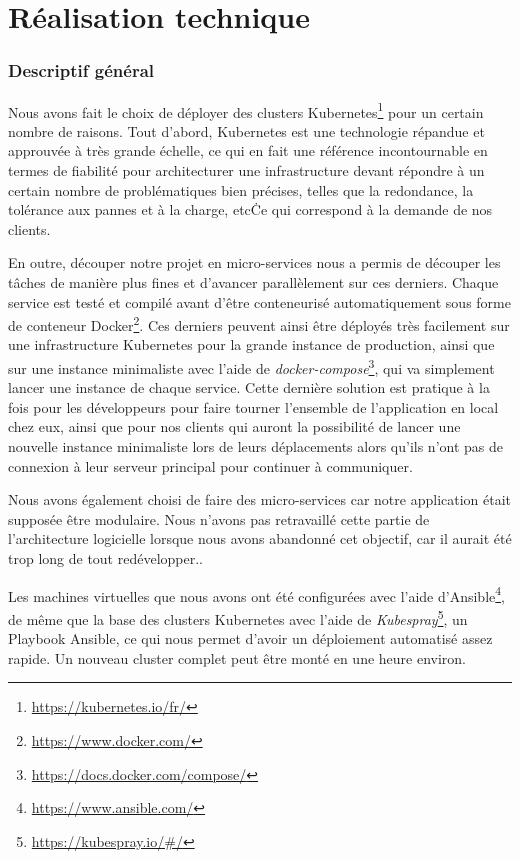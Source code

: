 \chapter{Réalisation technique}

\subsection{Descriptif général}

Nous avons fait le choix de déployer des clusters
Kubernetes\footnote{\url{https://kubernetes.io/fr/}}
pour un certain nombre de raisons. Tout d'abord, Kubernetes est une
technologie répandue et approuvée à très grande échelle, ce qui en fait
une référence incontournable en termes de fiabilité pour architecturer
une infrastructure devant répondre à un certain nombre de problématiques
bien précises, telles que la redondance, la tolérance aux pannes et à la
charge, etc\.
Ce qui correspond à la demande de nos clients.

En outre, découper notre projet en micro-services nous a permis de
découper les tâches de manière plus fines et d'avancer parallèlement sur
ces derniers. Chaque service est testé et compilé avant d'être
conteneurisé automatiquement sous forme de conteneur
Docker\footnote{\url{https://www.docker.com/}}. Ces
derniers peuvent ainsi être déployés très facilement sur une
infrastructure Kubernetes pour la grande instance de production, ainsi
que sur une instance minimaliste avec l'aide de
\textit{docker-compose}\footnote{\url{https://docs.docker.com/compose/}},
qui va simplement lancer une instance de chaque service. Cette dernière
solution est pratique à la fois pour les développeurs pour faire tourner
l'ensemble de l'application en local chez eux, ainsi que pour nos
clients qui auront la possibilité de lancer une nouvelle instance
minimaliste lors de leurs déplacements alors qu'ils n'ont pas de
connexion à leur serveur principal pour continuer à communiquer.

Nous avons également choisi de faire des micro-services car notre
application était supposée être modulaire. Nous n'avons pas retravaillé
cette partie de l'architecture logicielle lorsque nous avons abandonné
cet objectif, car il aurait été trop long de tout redévelopper..

Les machines virtuelles que nous avons ont été configurées avec l'aide
d'Ansible\footnote{\url{https://www.ansible.com/}}, de
même que la base des clusters Kubernetes avec l'aide de
\textit{Kubespray}\footnote{\url{https://kubespray.io/\#/}}, un
Playbook Ansible, ce qui nous permet d'avoir un déploiement automatisé
assez rapide. Un nouveau cluster complet peut être monté en une heure
environ.

